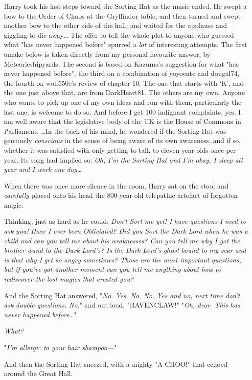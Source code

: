 Harry took his last steps toward the Sorting Hat as the music ended. He swept a
bow to the Order of Chaos at the Gryffindor table, and then turned and swept
another bow to the other side of the hall, and waited for the applause and
giggling to die away…
The offer to tell the whole plot to anyone who guessed what "has never happened
before" spurred a \emph{lot} of interesting attempts. The first omake below is
taken directly from my personal favourite answer, by Meteoricshipyards. The
second is based on Kazuma's suggestion for what "has never happened before",
the third on a combination of yoyoente and dougal74, the fourth on wolf550e's
review of chapter 10. The one that starts with `K', and the one just above
that, are from DarkHeart81. The others are my own. Anyone who wants to pick up
one of my own ideas and run with them, particularly the last one, is welcome to
do so. And before I get 100 indignant complaints, yes, I am well aware that the
legislative body of the UK is the House of Commons in Parliament.
\later
…In the back of his mind, he wondered if the Sorting Hat was genuinely
\emph{conscious} in the sense of being aware of its own awareness, and if so,
whether it was satisfied with only getting to talk to eleven-year-olds once per
year. Its song had implied so: \emph{Oh, I'm the Sorting Hat and I'm okay, I
sleep all year and I work one day…}

When there was once more silence in the room, Harry sat on the stool and
\emph{carefully} placed onto his head the 800-year-old telepathic artefact of
forgotten magic.

Thinking, just as hard as he could: \emph{Don't Sort me yet! I have questions I
need to ask you! Have I ever been Obliviated? Did you Sort the Dark Lord when
he was a child and can you tell me about his weaknesses? Can you tell me why I
got the brother wand to the Dark Lord's? Is the Dark Lord's ghost bound to my
scar and is that why I get so angry sometimes? Those are the most important
questions, but if you've got another moment can you tell me anything about how
to rediscover the lost magics that created you?}

And the Sorting Hat answered, "\emph{No. Yes. No. No. Yes and no, next time
don't ask double questions. No.}" and out loud, "RAVENCLAW!"
\later
"\emph{Oh, dear. This has never happened before…}"

\emph{What?}

"\emph{I'm allergic to your hair shampoo---}"

And then the Sorting Hat sneezed, with a mighty "A-CHOO!" that echoed around
the Great Hall.

